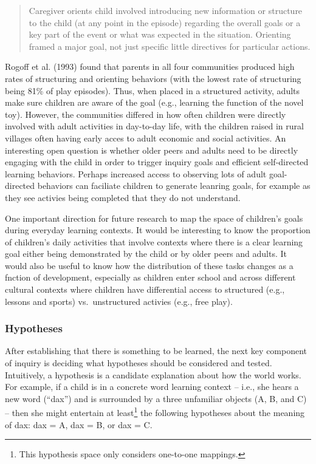 \documentclass[english,man]{apa6}
\theoremstyle{definition}
\theoremstyle{definition}
\theoremstyle{definition}
\theoremstyle{remark}
\begin{document}
\begin{quote}
Caregiver orients child involved introducing new information or
structure to the child (at any point in the episode) regarding the
overall goals or a key part of the event or what was expected in the
situation. Orienting framed a major goal, not just specific little
directives for particular actions.
\end{quote}

Rogoff et al. (1993) found that parents in all four communities produced
high rates of structuring and orienting behaviors (with the lowest rate
of structuring being 81\% of play episodes). Thus, when placed in a
structured activity, adults make sure children are aware of the goal
(e.g., learning the function of the novel toy). However, the communities
differed in how often children were directly involved with adult
activities in day-to-day life, with the children raised in rural
villages often having early acces to adult economic and social
activities. An interesting open question is whether older peers and
adults need to be directly engaging with the child in order to trigger
inquiry goals and efficient self-directed learning behaviors. Perhaps
increased access to observing lots of adult goal-directed behaviors can
faciliate children to generate leanring goals, for example as they see
activies being completed that they do not understand.

One important direction for future research to map the space of
children's goals during everyday learning contexts. It would be
interesting to know the proportion of children's daily activities that
involve contexts where there is a clear learning goal either being
demonstrated by the child or by older peers and adults. It would also be
useful to know how the distribution of these tasks changes as a fnction
of development, especially as children enter school and across different
cultural contexts where children have differential access to structured
(e.g., lessons and sports) vs.~unstructured activies (e.g., free play).

\subsubsection{Hypotheses}\label{hypotheses}

After establishing that there is something to be learned, the next key
component of inquiry is deciding what hypotheses should be considered
and tested. Intuitively, a hypothesis is a candidate explanation about
how the world works. For example, if a child is in a concrete word
learning context -- i.e., she hears a new word (\enquote{dax}) and is
surrounded by a three unfamiliar objects (A, B, and C) -- then she might
entertain at least\footnote{This hypothesis space only considers
  one-to-one mappings.} the following hypotheses about the meaning of
dax: dax = A, dax = B, or dax = C.
\end{document}
